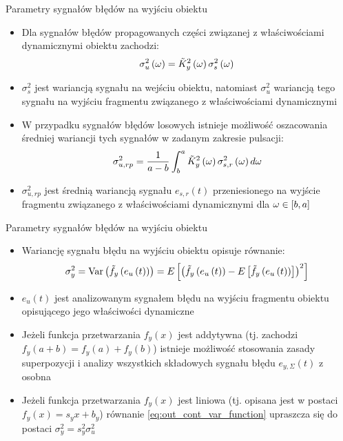 \documentclass[12pt, polish, aspectratio = 169]{beamer}
\begin{document}
\begin{frame}{Parametry sygnałów błędów na wyjściu obiektu}
\begin{itemize}
\item Dla sygnałów błędów propagowanych części związanej z właściwościami dynamicznymi obiektu zachodzi:
\begin{equation}
\sigma_{u}^{2} \left(\omega\right) = \tilde{K}_{y}^{2} \left(\omega\right) \sigma_{s}^{2} \left(\omega\right) \label{eq:mid_cont_var_omega}
\end{equation}
\item $\sigma_{s}^{2}$ jest wariancją sygnału na wejściu obiektu, natomiast $\sigma_{u}^{2}$ wariancją tego sygnału na wyjściu fragmentu związanego z właściwościami dynamicznymi
\item W przypadku sygnałów błędów losowych istnieje możliwość oszacowania średniej wariancji tych sygnałów w zadanym zakresie pulsacji:
\begin{equation}
\sigma_{u,rp}^{2} = \frac{1}{a - b} \int _{b} ^{a} \tilde{K}_{y}^{2} \left(\omega\right) \sigma_{s,r}^{2} \left(\omega\right) d\omega \label{eq:mid_cont_var_rand}
\end{equation}
\item $\sigma_{u,rp}^{2}$ jest średnią wariancją sygnału $e_{s,r}(t)$ przeniesionego na wyjście fragmentu związanego z właściwościami dynamicznymi dla $\omega \in \interval{b}{a}$
\end{itemize}
\end{frame}

\begin{frame}{Parametry sygnałów błędów na wyjściu obiektu}
\begin{itemize}
\item Wariancję sygnału błędu na wyjściu obiektu opisuje równanie:
\begin{equation}
\sigma_{y}^{2} = \text{Var}\left(\tilde{f}_{y} \left(e_{u} \left(t\right)\right)\right) = E \left[ \left( \tilde{f}_{y} \left(e_{u} \left(t\right)\right) - E \left[ \tilde{f}_{y} \left(e_{u} \left(t\right)\right) \right] \right)^2 \right] \label{eq:out_cont_var_function}
\end{equation}
\item $e_{u}(t)$ jest analizowanym sygnałem błędu na wyjściu fragmentu obiektu opisującego jego właściwości dynamiczne
\item Jeżeli funkcja przetwarzania $f_{y}(x)$ jest addytywna (tj. zachodzi $f_{y}(a+b) = f_{y}(a) + f_{y}(b)$) istnieje możliwość stosowania zasady superpozycji i analizy wszystkich składowych sygnału błędu $e_{y,\Sigma}(t)$ z osobna
\item Jeżeli funkcja przetwarzania $f_{y}(x)$ jest liniowa (tj. opisana jest w postaci $f_{y}(x) = s_{y} x + b_{y}$) równanie \eqref{eq:out_cont_var_function} upraszcza się do postaci $\sigma_{y}^{2} = s_{y}^{2} \sigma_{u}^{2}$
\end{itemize}
\end{frame}
\end{document}
